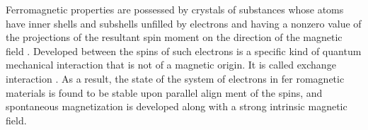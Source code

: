 Ferromagnetic properties are possessed by crystals of substances whose atoms have inner shells and subshells  unfilled by electrons and having a nonzero value of the projections of the resultant spin moment on the direction of the magnetic field . Developed between the spins of such electrons is a specific kind of quantum mechanical interaction that is not of a magnetic origin. It is called exchange interaction . As a result, the state of the system of electrons in fer­ romagnetic materials is found to be stable upon parallel align­ ment of the spins, and spontaneous magnetization  is developed along with a strong intrinsic magnetic field.
